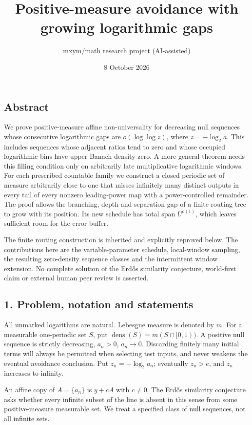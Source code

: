 \documentclass[
  11pt,
]{article}
\title{Positive-measure avoidance with growing logarithmic gaps}
\author{mxym/math research project (AI-assisted)}
\date{8 October 2026}
\begin{document}
\maketitle

\subsection{Abstract}\label{abstract}

We prove positive-measure affine non-universality for decreasing null
sequences whose consecutive logarithmic gaps are \(o(\log\log z)\),
where \(z=-\log_2 a\). This includes sequences whose adjacent ratios
tend to zero and whose occupied logarithmic bins have upper Banach
density zero. A more general theorem needs this filling condition only
on arbitrarily late multiplicative logarithmic windows. For each
prescribed countable family we construct a closed periodic set of
measure arbitrarily close to one that misses infinitely many distinct
outputs in every tail of every nonzero leading-power map with a
power-controlled remainder. The proof allows the branching, depth and
separation gap of a finite routing tree to grow with its position. Its
new schedule has total span \(U^{o(1)}\), which leaves sufficient room
for the error buffer.

The finite routing construction is inherited and explicitly reproved
below. The contributions here are the variable-parameter schedule,
local-window sampling, the resulting zero-density sequence classes and
the intermittent window extension. No complete solution of the Erdős
similarity conjecture, world-first claim or external human peer review
is asserted.

\subsection{1. Problem, notation and
statements}\label{problem-notation-and-statements}

All unmarked logarithms are natural. Lebesgue measure is denoted by
\(m\). For a measurable one-periodic set \(S\), put
\(\operatorname{dens}(S)=m(S\cap[0,1))\). A positive null sequence is
strictly decreasing, \(a_n>0\), \(a_n\to 0\). Discarding finitely many
initial terms will always be permitted when selecting test inputs, and
never weakens the eventual avoidance conclusion. Put
\(z_n=-\log_2 a_n\); eventually \(z_n>e\), and \(z_n\) increases to
infinity.

An affine copy of \(A=\{a_n\}\) is \(y+cA\) with \(c\ne 0\). The Erdős
similarity conjecture asks whether every infinite subset of the line is
absent in this sense from some positive-measure measurable set. We treat
a specified class of null sequences, not all infinite sets.
\end{document}
